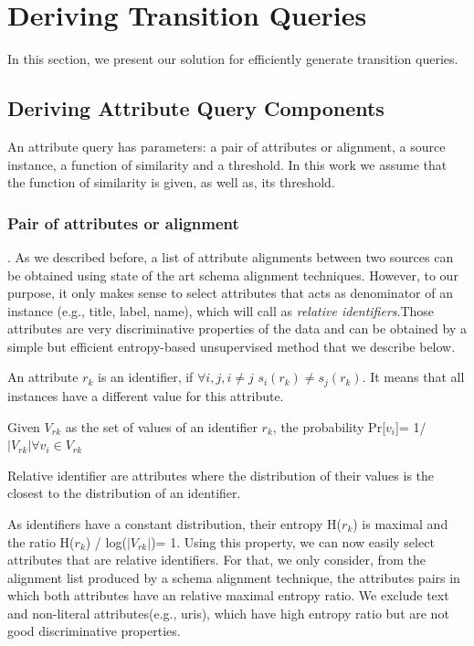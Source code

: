 \section{Deriving Transition Queries} 
In this section, we present our solution for efficiently generate transition queries. 

\subsection{Deriving Attribute Query Components} 

An attribute query has parameters: a pair of attributes or alignment, a source instance, a function of similarity and a threshold. In this work we assume that the function of similarity is given, as well as, its threshold.

\subsubsection{Pair of attributes or alignment}. As we described before, a list of attribute alignments between two sources can be obtained using state of the art schema alignment techniques. However, to our purpose, it only makes sense to select attributes that acts as denominator of an instance (e.g., title, label, name), which will call as \textit{relative identifiers}.Those attributes are very discriminative properties of the data and can be obtained by a simple but efficient entropy-based unsupervised method that we describe below.

\begin{definition}[Identifiers] An attribute $r_k$ is an identifier, if $\forall i,j, i \neq j$ $s_i(r_k) \neq  s_j(r_k)$. It means that all instances have a different value for this attribute.
\end{definition}  

\begin{definition} Given $V_{rk}$ as the set of values of an identifier $r_k$,  the probability Pr[$v_i$]= 1/ $|V_{rk}| \forall v_i \in V_{rk}$ 
\end{definition}  

\begin{definition} Relative identifier are attributes where the distribution of their values is the closest to the distribution of an identifier.
\end{definition}  

As identifiers have a constant distribution, their entropy H($r_k$) is maximal and the ratio H($r_k$) / log($|V_{rk}| $)= 1. Using this property, we can now easily select attributes that are relative identifiers. For that, we only consider, from the alignment list produced by a schema alignment technique, the attributes pairs in which both attributes have an relative maximal entropy ratio. We exclude text and non-literal attributes(e.g., uris), which have high entropy ratio but are not good discriminative properties.   

